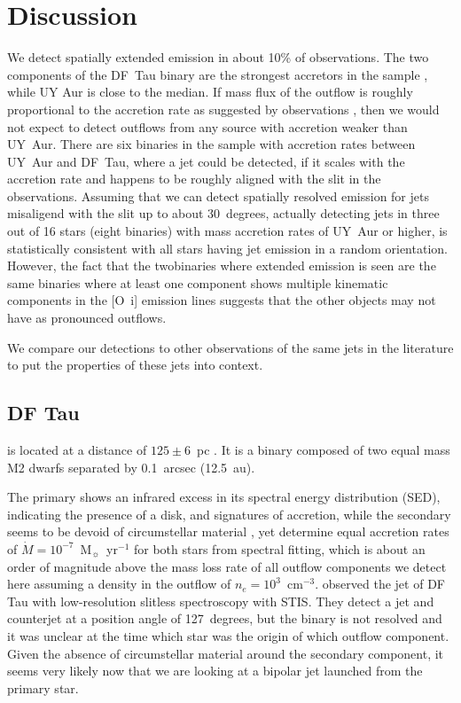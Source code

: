 \documentclass[twocolumn,trackchanges]{aastex63}
\begin{document}
\section{Discussion}
\label{sect:discussion}
We detect spatially extended emission in about 10\% of observations. 
The two components of the DF~Tau binary are the strongest accretors in
  the sample \citep{2003ApJ...583..334H}, while UY Aur is close to the
  median. 
If mass flux of the outflow is roughly
  proportional to the accretion rate as suggested by observations \citep{1990ApJ...354..687C,2008ApJ...689.1112C},
  then we would not expect to detect outflows from any source with accretion
  weaker than UY~Aur. There are six binaries in the sample with accretion rates
between UY~Aur and DF~Tau, where a jet could be detected, if it scales with the
accretion rate and happens to be roughly aligned with the slit in the
observations. Assuming that we can detect spatially resolved emission for jets
misaligend with the slit up to about 30~degrees, actually detecting jets in
three out of 16 stars (eight binaries) with mass accretion rates of UY~Aur or
higher, is statistically consistent with all stars having jet emission in a
random orientation.
 However, the fact that the twobinaries where extended
  emission is seen are the same binaries where at least one component shows multiple kinematic
components in the [O~{\sc i}] emission lines \citep{2003ApJ...583..334H}
suggests that the other objects may not have as pronounced outflows.

We compare our detections to other observations of the same jets in the literature to put the properties of these jets into context.

\subsection{DF Tau}
\label{sect:discussion:DFTau}
 is located at a distance of $125\pm6$~pc
\citep{2016A&A...595A...1G,2018A&A...616A...1G}. It is a binary composed of two
equal mass M2 dwarfs separated by 0.1~arcsec (12.5~au).

The primary shows an
infrared excess in its spectral energy distribution (SED), indicating the
presence of a disk, and signatures of accretion, while the secondary seems to
be devoid of circumstellar material \citep{2017ApJ...845..161A}, yet
\citet{2003ApJ...583..334H} determine equal accretion rates of $\dot
M=10^{-7}$~M$_{\sun}$~yr$^{-1}$ for both stars from spectral fitting, which is
about an order of magnitude above the mass loss rate of all outflow components
we detect here assuming a density in the outflow of $n_e=10^3$~cm$^{-3}$.
\citet{2004ApJ...609..261H} observed the jet of DF Tau with low-resolution slitless spectroscopy with STIS. They detect a jet and counterjet at a
position angle of 127~degrees, but the binary is not resolved and it was unclear at the time which star was the origin of which outflow component. Given the absence of circumstellar material around the secondary component, it seems very likely now that we are looking at a bipolar jet launched from the primary star.
\end{document}
